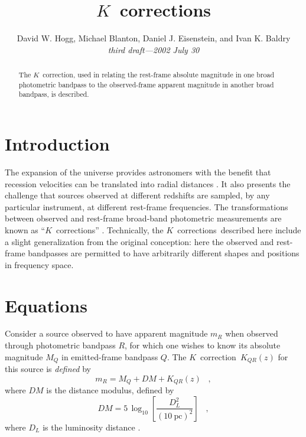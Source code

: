 \documentclass[preprint]{aastex}
\newcommand{\kcorrection}{$K$~correction}
\newcommand{\kcorrections}{{\kcorrection}s}
\begin{document}
\title{\kcorrections}
\author{
  David W. Hogg,
  Michael Blanton,
  Daniel J. Eisenstein,
  and Ivan K. Baldry\\
  \textsl{third draft---2002 July 30}
}

\begin{abstract}
The \kcorrection, used in relating the rest-frame absolute magnitude
in one broad photometric bandpass to the observed-frame apparent
magnitude in another broad bandpass, is described.
\end{abstract}

\section{Introduction}

The expansion of the universe provides astronomers with the benefit
that recession velocities can be translated into radial distances
\citep[eg,][and references therein]{hogg99cosm}.  It also presents the
challenge that sources observed at different redshifts are sampled, by
any particular instrument, at different rest-frame frequencies.  The
transformations between observed and rest-frame broad-band photometric
measurements are known as ``\kcorrections'' \citep*{humason56a,
oke68a}.  Technically, the \kcorrections\ described here include a
slight generalization from the original conception: here the observed
and rest-frame bandpasses are permitted to have arbitrarily different
shapes and positions in frequency space.

\section{Equations}

Consider a source observed to have apparent magnitude $m_R$ when
observed through photometric bandpass $R$, for which one wishes to
know its absolute magnitude $M_Q$ in emitted-frame bandpass $Q$.  The
\kcorrection\ $K_{QR}(z)$ for this source is \emph{defined} by
\begin{equation}
\label{eq:definition}
m_R = M_Q + DM + K_{QR}(z) \;\;\;,
\end{equation}
where $DM$ is the distance modulus, defined by
\begin{equation}
DM = 5\,\log_{10}\left[\frac{D_L^2}{(10~\mathrm{pc})^2}\right] \;\;\;,
\end{equation}
where $D_L$ is the luminosity distance \citep[eg,][]{hogg99cosm}.
\end{document}
